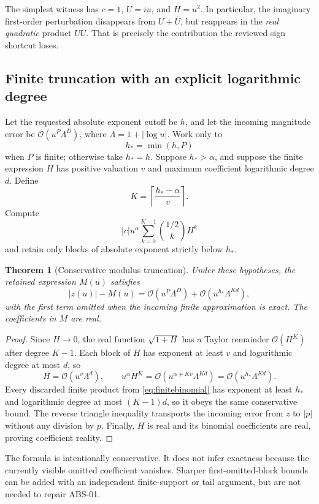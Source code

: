 \documentclass[11pt]{article}
\newcommand{\OO}{\mathcal O}
\newcommand{\LL}{\Lambda}
\newtheorem{theorem}{Theorem}[section]
\theoremstyle{remark}\newtheorem{remark}[theorem]{Remark}
\begin{document}
The simplest witness has \(c=1\), \(U=iu\), and \(H=u^2\). In particular, the
imaginary first-order perturbation disappears from \(U+\overline U\), but
reappears in the \emph{real quadratic} product \(U\overline U\). That is precisely
the contribution the reviewed sign shortcut loses.

\subsection{Finite truncation with an explicit logarithmic degree}
Let the requested absolute exponent cutoff be \(h\), and let the incoming
magnitude error be \(\OO(u^P\LL^D)\), where \(\LL=1+|\log u|\). Work only to
\[
 h_* = \min(h,P)
\]
when \(P\) is finite; otherwise take \(h_*=h\). Suppose \(h_*>\alpha\), and
suppose the finite expression \(H\) has positive valuation \(v\) and maximum
coefficient logarithmic degree \(d\). Define
\[
 K=\left\lceil\frac{h_*-\alpha}{v}\right\rceil.
\]
Compute
\begin{equation}\label{eq:finitebinomial}
 |c|u^\alpha\sum_{k=0}^{K-1}\binom{1/2}{k}H^k
\end{equation}
and retain only blocks of absolute exponent strictly below \(h_*\).

\begin{theorem}[Conservative modulus truncation]\label{thm:modulus}
Under these hypotheses, the retained expression \(M(u)\) satisfies
\[
 |z(u)|-M(u)
 =\OO(u^P\LL^D)+\OO(u^{h_*}\LL^{Kd}),
\]
with the first term omitted when the incoming finite approximation is exact.
The coefficients in \(M\) are real.
\end{theorem}
\begin{proof}
Since \(H\to0\), the real function \(\sqrt{1+H}\) has a Taylor remainder
\(\OO(H^K)\) after degree \(K-1\). Each block of \(H\) has exponent at least
\(v\) and logarithmic degree at most \(d\), so
\[
 H=\OO(u^v\LL^d),\qquad
 u^\alpha H^K=\OO(u^{\alpha+Kv}\LL^{Kd})
              =\OO(u^{h_*}\LL^{Kd}).
\]
Every discarded finite product from \eqref{eq:finitebinomial} has exponent at
least \(h_*\) and logarithmic degree at most \((K-1)d\), so it obeys the same
conservative bound. The reverse triangle inequality transports the incoming
error from \(z\) to \(|p|\) without any division by \(p\). Finally, \(H\) is real
and its binomial coefficients are real, proving coefficient reality.
\end{proof}

The formula is intentionally conservative. It does not infer exactness because
the currently visible omitted coefficient vanishes. Sharper first-omitted-block
bounds can be added with an independent finite-support or tail argument, but
are not needed to repair ABS-01.
\end{document}
